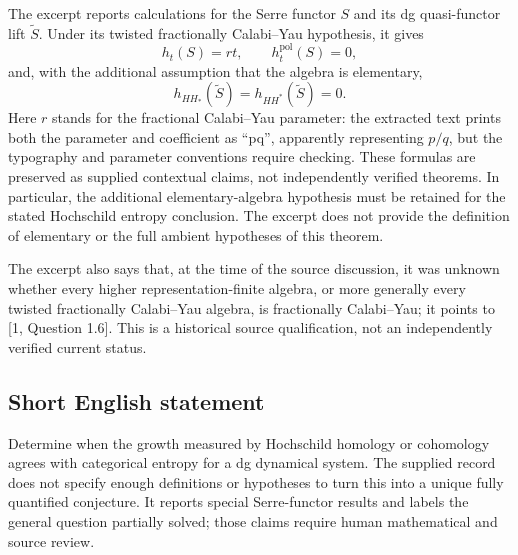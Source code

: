 \documentclass[11pt]{article}
\begin{document}
The excerpt reports calculations for the Serre functor \(S\) and its dg quasi-functor lift \(\widetilde S\). Under its twisted fractionally Calabi--Yau hypothesis, it gives
\[
 h_t(S)=rt,\qquad h_t^{\mathrm{pol}}(S)=0,
\]
and, with the additional assumption that the algebra is elementary,
\[
 h_{HH_*}(\widetilde S)=h_{HH^*}(\widetilde S)=0.
\]
Here \(r\) stands for the fractional Calabi--Yau parameter: the extracted text prints both the parameter and coefficient as ``pq'', apparently representing \(p/q\), but the typography and parameter conventions require checking. These formulas are preserved as supplied contextual claims, not independently verified theorems. In particular, the additional elementary-algebra hypothesis must be retained for the stated Hochschild entropy conclusion. The excerpt does not provide the definition of elementary or the full ambient hypotheses of this theorem.

The excerpt also says that, at the time of the source discussion, it was unknown whether every higher representation-finite algebra, or more generally every twisted fractionally Calabi--Yau algebra, is fractionally Calabi--Yau; it points to [1, Question 1.6]. This is a historical source qualification, not an independently verified current status.
\subsection{Short English statement}
Determine when the growth measured by Hochschild homology or cohomology agrees with categorical entropy for a dg dynamical system. The supplied record does not specify enough definitions or hypotheses to turn this into a unique fully quantified conjecture. It reports special Serre-functor results and labels the general question partially solved; those claims require human mathematical and source review.
\end{document}
